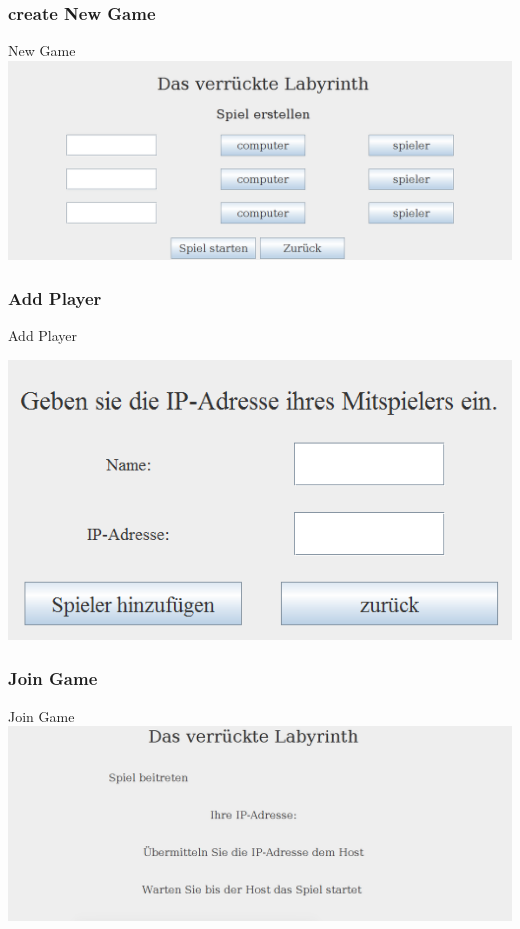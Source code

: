 \documentclass{beamer}
\begin{document}
		    \label{Frame3}	
			\begin{frame}
				\frametitle{create New Game}
				\begin{block}{New Game}
					\includegraphics[scale=0.25]{Bilder/bild2.png}
				\end{block}		
			\end{frame}
			\label{Frame4}	
			\begin{frame}
				\frametitle{Add Player}
				\begin{block}{Add Player}
					\begin{center}
						\includegraphics[scale=0.57]{Bilder/bild5.png}
					\end{center}
					
				\end{block}		
			\end{frame}	
			\label{Frame5}	
			\begin{frame}
				\frametitle{Join Game}
				\begin{block}{Join Game}
					\includegraphics[scale=0.25]{Bilder/bild4.png}
				\end{block}		
			\end{frame}
			
\end{document}
